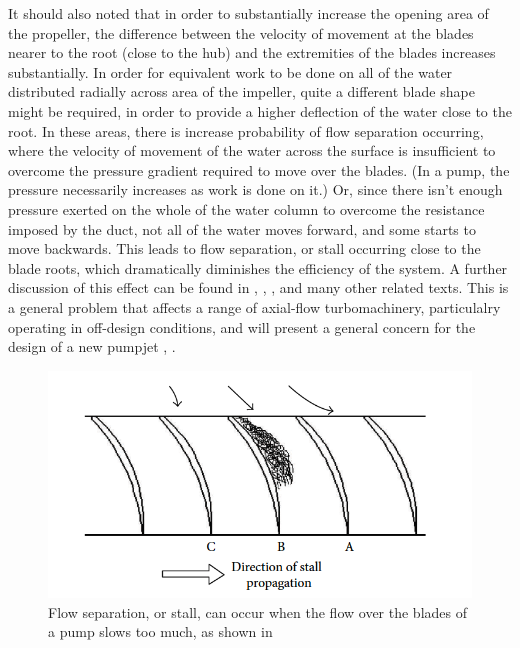 \documentclass{article}\usepackage[]{graphicx}\usepackage[]{color}
\begin{document}
It should also noted that in order to substantially increase the opening area of the propeller, the difference between the velocity of movement at the blades nearer to the root (close to the hub) and the extremities of the blades increases substantially.  In order for equivalent work to be done on all of the water distributed radially across area of the impeller, quite a different blade shape might be required, in order to provide a higher deflection of the water close to the root. In these areas, there is increase probability of flow separation occurring, where the velocity of movement of the water across the surface is insufficient to overcome the pressure gradient required to move over the blades.  (In a pump, the pressure necessarily increases as work is done on it.)  Or, since there isn't enough pressure exerted on the whole of the water column to overcome the resistance imposed by the duct, not all of the water moves forward, and some starts to move backwards.  This leads to flow separation, or stall occurring close to the blade roots, which dramatically diminishes the efficiency of the system. A further discussion of this effect can be found in \cite[15,27]{henderson1964},  \cite[807,8012]{bruce1974},  \cite[185]{wislicenus1973}, \cite[60]{mcbride1979} and many other related texts.  This is a general problem that affects a range of axial-flow turbomachinery, particulalry operating in off-design conditions, and will present a general concern for the design of a new pumpjet \cite[185]{wislicenus1986}, \cite{li2013}.

\begin{figure}
\includegraphics[width=\textwidth]{stall.png}
\caption{Flow separation, or stall, can occur when the flow over the blades of a pump slows too much, as shown in \cite{li2013}}
\label{fig:stall.png}
\end{figure}
\end{document}
